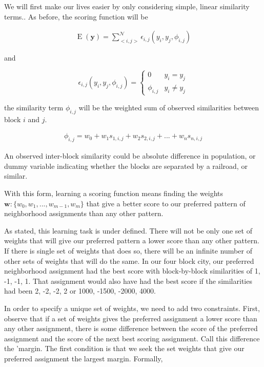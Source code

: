We will first make our lives easier by only considering simple, linear
similarity terms.. As before, the scoring function will be

\begin{align}
\operatorname{E}(\mathbf{y}) = \sum_{<i,j>}^{\mathcal{N}}\epsilon_{i,j}(y_i,y_j,\phi_{i,j})
\end{align}

\noindent
and

\begin{equation}
\epsilon_{i,j}(y_i,y_j,\phi_{i,j}) = \begin{cases}
  0 &y_i = y_j \\
  \phi_{i,j} &y_i \neq y_j
\end{cases}
\end{equation}

\noindent
the similarity term $\phi_{i,j}$ will be the weighted sum of
observed similarities between block $i$ and $j$. 

\begin{align}
\phi_{i,j} = w_0 + w_1s_{1,i,j} + w_2s_{2,i,j} + ... + w_ns_{n,i,j}
\end{align} 

\noindent
An observed inter-block similarity could be absolute difference in
population, or dummy variable indicating whether the blocks are
separated by a railroad, or similar.

\noindent

With this form, learning a scoring function means finding the weights
$\mathbf{w}: \{w_0, w_1, ..., w_{m-1}, w_m\}$ that give a better score
to our preferred pattern of neighborhood assignments than any other
pattern.

As stated, this learning task is under defined. There will not be only
one set of weights that will give our preferred pattern a lower score
than any other pattern. If there is single set of weights that does
so, there will be an infinite number of other sets of weights that
will do the same. In our four block city, our preferred
neighborhood assignment had the best score with block-by-block
similarities of 1, -1, -1, 1. That assignment would also have had the
best score if the similarities had been 2, -2, -2, 2 or 1000, -1500,
-2000, 4000.

In order to specify a unique set of weights, we need to add two
constraints. First, observe that if a set of weights gives the
preferred assignment a lower score than any other assignment, there is
some difference between the score of the preferred assignment and the
score of the next best scoring assignment. Call this difference the
'margin. The first condition is that we seek the set weights that give
our preferred assignment the largest margin. Formally,

